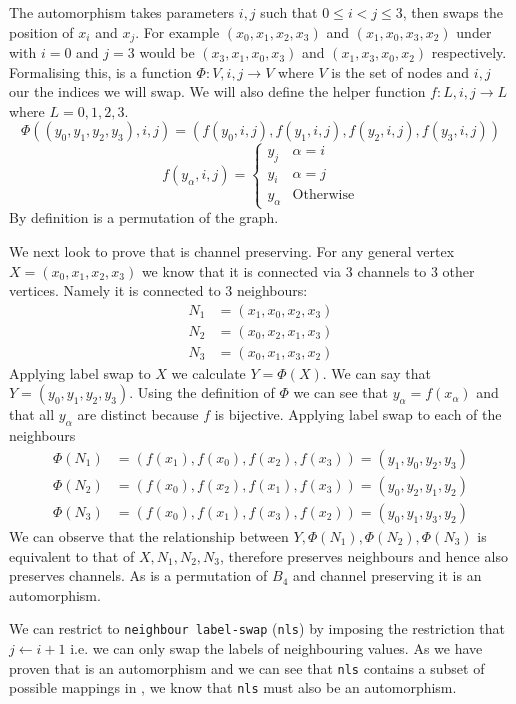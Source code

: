 The \ls automorphism takes parameters $i, j$ such that $0 \leq i <j \leq 3$, then swaps the position of $x_i$ and $x_j$.
 For example $(x_0, x_1, x_2, x_3)$ and $(x_1, x_0, x_3, x_2)$ under \ls with $i=0$ and $j=3$ would be $(x_3, x_1, x_0, x_3)$ and $(x_1, x_3, x_0, x_2)$ respectively.
 Formalising this, \ls is a function $\Phi: V, i, j \rightarrow V$ where $V$ is the set of nodes and $i,j$ our the indices we will swap.
 We will also define the helper function $f: L, i, j \rightarrow L$ where $L={0,1,2,3}$.
 \[ \Phi((y_0, y_1, y_2, y_3), i,j )=(f(y_0,i,j), f(y_1,i,j), f(y_2,i,j), f(y_3,i,j))
\]
\[ f(y_\alpha, i, j) = 
    \begin{cases} 
      y_j & \alpha=i \\
      y_i & \alpha=j \\
      y_\alpha & \text{Otherwise} 
   \end{cases}
\]
By definition \ls is a permutation of the graph.

We next look to prove that \ls is channel preserving.
For any general vertex $X=(x_0, x_1, x_2, x_3)$ we know that it is connected via 3 channels to 3 other vertices. 
Namely it is connected to 3 neighbours:
\begin{align*}
N_1 &= (x_1, x_0, x_2, x_3)\\
N_2 &= (x_0, x_2, x_1, x_3)\\
N_3 &= (x_0, x_1, x_3, x_2)
\end{align*}
Applying label swap to $X$ we calculate $Y=\Phi(X)$.
We can say that $Y=(y_0, y_1, y_2, y_3)$.
Using the definition of $\Phi$ we can see that $y_\alpha = f(x_\alpha)$ and that all $y_\alpha$ are distinct because $f$ is bijective.
Applying label swap to each of the neighbours
\begin{align*}
\Phi(N_1) &= (f(x_1), f(x_0), f(x_2), f(x_3))=(y_1, y_0, y_2, y_3)\\
\Phi(N_2) &= (f(x_0), f(x_2), f(x_1), f(x_3))=(y_0, y_2, y_1, y_2)\\
\Phi(N_3) &= (f(x_0), f(x_1), f(x_3), f(x_2))=(y_0, y_1, y_3, y_2)
\end{align*}
We can observe that the relationship between $Y, \Phi(N_1), \Phi(N_2), \Phi(N_3)$ is equivalent to that of $X, N_1, N_2, N_3$, therefore \ls preserves neighbours and hence also preserves channels.
As \ls is a permutation of $B_4$ and channel preserving it is an automorphism.

We can restrict \ls to \texttt{neighbour label-swap} (\texttt{nls}) by imposing the restriction that $j\leftarrow i+1$ i.e. we can only swap the labels of neighbouring values.
As we have proven that \ls is an automorphism and we can see that \texttt{nls} contains a subset of possible mappings in \ls, we know that \texttt{nls} must also be an automorphism.

